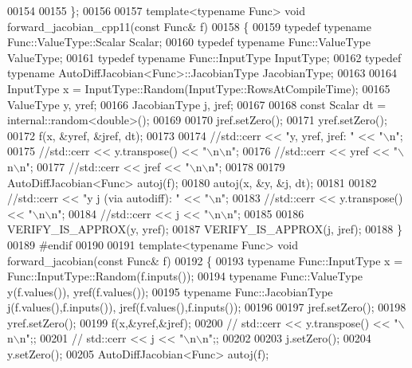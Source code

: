 \begin{DoxyCode}
00154 
00155 \};
00156 
00157 \textcolor{keyword}{template}<\textcolor{keyword}{typename} Func> \textcolor{keywordtype}{void} forward\_jacobian\_cpp11(\textcolor{keyword}{const} Func& f)
00158 \{
00159     \textcolor{keyword}{typedef} \textcolor{keyword}{typename} Func::ValueType::Scalar Scalar;
00160     \textcolor{keyword}{typedef} \textcolor{keyword}{typename} Func::ValueType ValueType;
00161     \textcolor{keyword}{typedef} \textcolor{keyword}{typename} Func::InputType InputType;
00162     \textcolor{keyword}{typedef} \textcolor{keyword}{typename} AutoDiffJacobian<Func>::JacobianType JacobianType;
00163 
00164     InputType x = InputType::Random(InputType::RowsAtCompileTime);
00165     ValueType y, yref;
00166     JacobianType j, jref;
00167 
00168     \textcolor{keyword}{const} Scalar dt = internal::random<double>();
00169 
00170     jref.setZero();
00171     yref.setZero();
00172     f(x, &yref, &jref, dt);
00173 
00174     \textcolor{comment}{//std::cerr << "y, yref, jref: " << "\(\backslash\)n";}
00175     \textcolor{comment}{//std::cerr << y.transpose() << "\(\backslash\)n\(\backslash\)n";}
00176     \textcolor{comment}{//std::cerr << yref << "\(\backslash\)n\(\backslash\)n";}
00177     \textcolor{comment}{//std::cerr << jref << "\(\backslash\)n\(\backslash\)n";}
00178 
00179     AutoDiffJacobian<Func> autoj(f);
00180     autoj(x, &y, &j, dt);
00181 
00182     \textcolor{comment}{//std::cerr << "y j (via autodiff): " << "\(\backslash\)n";}
00183     \textcolor{comment}{//std::cerr << y.transpose() << "\(\backslash\)n\(\backslash\)n";}
00184     \textcolor{comment}{//std::cerr << j << "\(\backslash\)n\(\backslash\)n";}
00185 
00186     VERIFY\_IS\_APPROX(y, yref);
00187     VERIFY\_IS\_APPROX(j, jref);
00188 \}
00189 \textcolor{preprocessor}{#endif}
00190 
00191 \textcolor{keyword}{template}<\textcolor{keyword}{typename} Func> \textcolor{keywordtype}{void} forward\_jacobian(\textcolor{keyword}{const} Func& f)
00192 \{
00193     \textcolor{keyword}{typename} Func::InputType x = Func::InputType::Random(f.inputs());
00194     \textcolor{keyword}{typename} Func::ValueType y(f.values()), yref(f.values());
00195     \textcolor{keyword}{typename} Func::JacobianType j(f.values(),f.inputs()), jref(f.values(),f.inputs());
00196 
00197     jref.setZero();
00198     yref.setZero();
00199     f(x,&yref,&jref);
00200 \textcolor{comment}{//     std::cerr << y.transpose() << "\(\backslash\)n\(\backslash\)n";;}
00201 \textcolor{comment}{//     std::cerr << j << "\(\backslash\)n\(\backslash\)n";;}
00202 
00203     j.setZero();
00204     y.setZero();
00205     AutoDiffJacobian<Func> autoj(f);

\end{DoxyCode}
